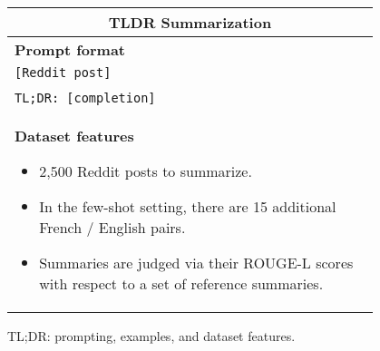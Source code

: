 \begin{figure}[p]
    \centering \small
    \begin{tabular}{p{0.95\linewidth}}
    \toprule
    \multicolumn{1}{c}{\textbf{TLDR Summarization}} \\

    \midrule
    \textbf{Prompt format}  \\
    \texttt{[Reddit post]} \\\\
    \texttt{TL;DR: [completion]} \\

    \midrule
    \textbf{Dataset features}
    \begin{itemize}
        \item 2,500 Reddit posts to summarize.
        \item In the few-shot setting, there are 15 additional French / English pairs.
        \item Summaries are judged via their ROUGE-L scores with respect to a set of reference summaries.
    \end{itemize} \\

    \bottomrule
    \end{tabular}
    \caption{TL;DR: prompting, examples, and dataset features.}
    \label{tab:prompt-tldr}
\end{figure}
